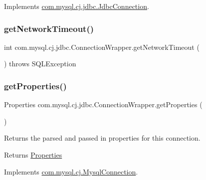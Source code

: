 Implements \mbox{\hyperlink{interfacecom_1_1mysql_1_1cj_1_1jdbc_1_1_jdbc_connection_af10e050fd33e42f9daddf69224c5179e}{com.\+mysql.\+cj.\+jdbc.\+Jdbc\+Connection}}.

\mbox{\label{classcom_1_1mysql_1_1cj_1_1jdbc_1_1_connection_wrapper_ae9e6cb441c049c825f130ec1aeb4fcf7}} 
\subsubsection{\texorpdfstring{get\+Network\+Timeout()}{getNetworkTimeout()}}
{\footnotesize\ttfamily int com.\+mysql.\+cj.\+jdbc.\+Connection\+Wrapper.\+get\+Network\+Timeout (\begin{DoxyParamCaption}{ }\end{DoxyParamCaption}) throws S\+Q\+L\+Exception}

\mbox{\label{classcom_1_1mysql_1_1cj_1_1jdbc_1_1_connection_wrapper_a76eea5af4534baf71ff0852b0c0f6f9c}} 
\subsubsection{\texorpdfstring{get\+Properties()}{getProperties()}}
{\footnotesize\ttfamily Properties com.\+mysql.\+cj.\+jdbc.\+Connection\+Wrapper.\+get\+Properties (\begin{DoxyParamCaption}{ }\end{DoxyParamCaption})}

Returns the parsed and passed in properties for this connection.

\begin{DoxyReturn}{Returns}
\mbox{\hyperlink{}{Properties}} 
\end{DoxyReturn}


Implements \mbox{\hyperlink{interfacecom_1_1mysql_1_1cj_1_1_mysql_connection_a1fde8714cc1e2176748fd4f35f0df0d1}{com.\+mysql.\+cj.\+Mysql\+Connection}}.

